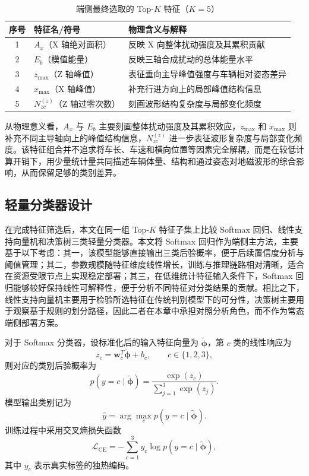 \begin{table}[!htbp]
\centering
\small
\caption{端侧最终选取的 Top-$K$ 特征（$K=5$）}
\label{tab:ch3_edge_selected_feat}
\begin{tabular}{c p{4.8cm} p{6.0cm}}
\hline
序号 & 特征名/符号 & 物理含义与解释 \\
\hline
1 & $A_x$（X 轴绝对面积） & 反映 X 向整体扰动强度及其累积贡献 \\
2 & $E_b$（模值能量） & 反映三轴合成扰动的总体能量水平 \\
3 & $z_{\max}$（Z 轴峰值） & 表征垂向主导峰值强度与车辆相对姿态差异 \\
4 & $x_{\max}$（X 轴峰值） & 补充行进方向上的局部峰值结构信息 \\
5 & $N_{zc}^{(z)}$（Z 轴过零次数） & 刻画波形结构复杂度与局部变化频度 \\
\hline
\end{tabular}
\end{table}

从物理意义看，$A_x$ 与 $E_b$ 主要刻画整体扰动强度及其累积效应，$z_{\max}$ 和 $x_{\max}$ 则补充不同主导轴向上的峰值结构信息，$N_{zc}^{(z)}$ 进一步表征波形复杂度与局部变化频度。该特征组合并不追求将车长、车速和横向位置等因素完全解耦，而是在较低计算开销下，用少量统计量共同描述车辆体量、结构和通过姿态对地磁波形的综合影响，从而保留足够的类别差异。


\subsection{轻量分类器设计}
\label{subsec:ch3_edge_cls}

在完成特征筛选后，本文在同一组 Top-$K$ 特征子集上比较 Softmax 回归、线性支持向量机和决策树三类轻量分类器。本文将 Softmax 回归作为端侧主方法，主要基于以下考虑：其一，该模型能够直接输出三类后验概率，便于后续置信度分析与阈值管理；其二，参数规模随特征维度线性增长，训练与推理链路相对清晰，适合在资源受限节点上实现稳定部署；其三，在低维统计特征输入条件下，Softmax 回归能够较好保持线性可解释性，便于分析不同特征对分类结果的贡献。相比之下，线性支持向量机主要用于检验所选特征在传统判别模型下的可分性，决策树主要用于观察基于规则的划分路径，因此二者在本章中承担对照分析角色，而不作为常态端侧部署方案。

对于 Softmax 分类器，设标准化后的输入特征向量为 $\tilde{\boldsymbol{\phi}}$，第 $c$ 类的线性响应为
\begin{equation}
    z_c=\mathbf{w}_c^T\tilde{\boldsymbol{\phi}}+b_c,\qquad c\in\{1,2,3\},
\end{equation}
则对应的类别后验概率为
\begin{equation}
    p(y=c\mid \tilde{\boldsymbol{\phi}})=\frac{\exp(z_c)}{\sum_{j=1}^{3}\exp(z_j)}.
\end{equation}
模型输出类别记为
\begin{equation}
    \hat{y}=\arg\max_{c} p(y=c\mid \tilde{\boldsymbol{\phi}}).
\end{equation}
训练过程中采用交叉熵损失函数
\begin{equation}
    \mathcal{L}_{\mathrm{CE}}=-\sum_{c=1}^{3} y_c\log p(y=c\mid \tilde{\boldsymbol{\phi}}),
\end{equation}
其中 $y_c$ 表示真实标签的独热编码。

